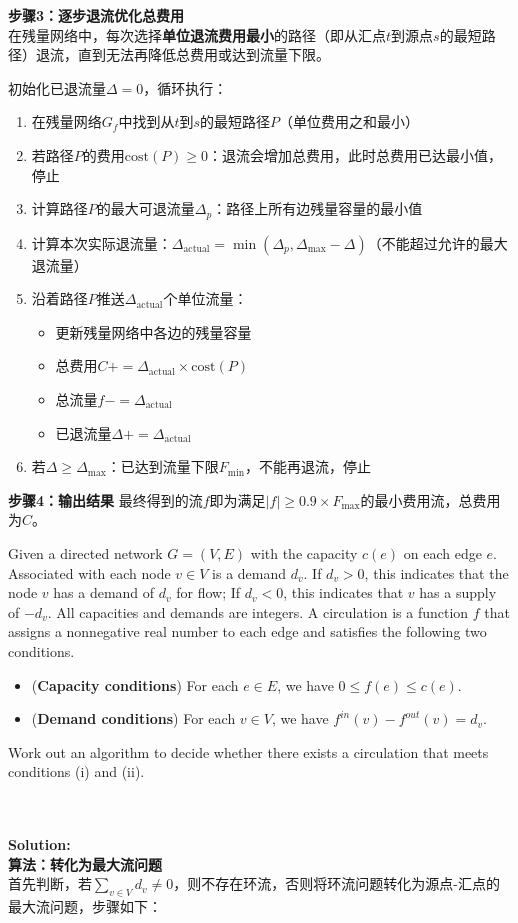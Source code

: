 \documentclass{article}
\newcounter{exercise}
\newcommand{\<}{
    \langle}
\renewcommand{\>}{
    \rangle}
\begin{document}
{\noindent\textbf{步骤3：逐步退流优化总费用}\\
在残量网络中，每次选择\textbf{单位退流费用最小}的路径（即从汇点$t$到源点$s$的最短路径）退流，直到无法再降低总费用或达到流量下限。

初始化已退流量$\Delta=0$，循环执行：
\begin{enumerate}
    \item 在残量网络$G_f$中找到从$t$到$s$的最短路径$P$（单位费用之和最小）
    \item 若路径$P$的费用$\text{cost}(P)\geq0$：退流会增加总费用，此时总费用已达最小值，停止
    \item 计算路径$P$的最大可退流量$\Delta_p$：路径上所有边残量容量的最小值
    \item 计算本次实际退流量：$\Delta_{\text{actual}}=\min(\Delta_p, \Delta_{\text{max}}-\Delta)$（不能超过允许的最大退流量）
    \item 沿着路径$P$推送$\Delta_{\text{actual}}$个单位流量：
    \begin{itemize}
        \item 更新残量网络中各边的残量容量
        \item 总费用$C += \Delta_{\text{actual}}\times\text{cost}(P)$
        \item 总流量$f -= \Delta_{\text{actual}}$
        \item 已退流量$\Delta += \Delta_{\text{actual}}$
    \end{itemize}
    \item 若$\Delta\geq\Delta_{\text{max}}$：已达到流量下限$F_{\text{min}}$，不能再退流，停止
\end{enumerate}

\noindent\textbf{步骤4：输出结果}
最终得到的流$f$即为满足$|f|\geq 0.9\times F_{\text{max}}$的最小费用流，总费用为$C$。

\begin{exercise}
Given a directed network $G=(V,E)$ with the capacity $c(e)$ on each edge $e$. Associated with each node $v\in V$ is a demand $d_v$. If $d_v>0$, this indicates that the node $v$ has a demand of $d_v$ for flow; If $d_v<0$, this indicates that $v$ has a supply of $-d_v$. All capacities and demands are integers.
A circulation is a function $f$ that assigns a nonnegative real number to each edge and satisfies the following two conditions.
\begin{itemize}
\item[(i)]  (\textbf{Capacity conditions}) For each $e\in E$, we have $0\leq f(e)\leq c(e)$.
\item[(ii)]  (\textbf{Demand conditions}) For each $v\in V$, we have $f^{in}(v)-f^{out}(v)=d_v$.
\end{itemize}
Work out an algorithm to decide whether there exists a circulation that meets conditions (i) and (ii).
\end{exercise}
\\\\
\noindent\textbf{Solution:}
\\
\noindent\textbf{算法：转化为最大流问题}\\
首先判断，若$\sum_{v\in V} d_v \neq 0$，则不存在环流，否则将环流问题转化为源点-汇点的最大流问题，步骤如下：

}
\end{document}
